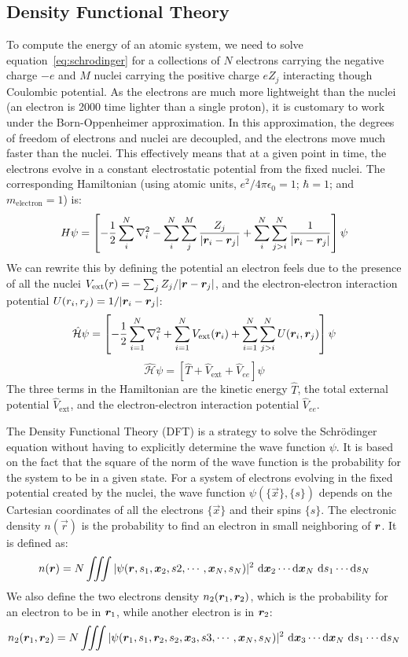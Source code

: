 \documentclass[thesis]{subfiles}
\begin{document}
\subsection{Density Functional Theory}

To compute the energy of an atomic system, we need to solve
equation~\eqref{eq:schrodinger} for a collections of $N$ electrons carrying the
negative charge $-e$ and $M$ nuclei carrying the positive charge $e Z_j$
interacting though Coulombic potential. As the electrons are much more
lightweight than the nuclei (an electron is 2000 time lighter than a single
proton), it is customary to work under the Born-Oppenheimer approximation. In
this approximation, the degrees of freedom of electrons and nuclei are
decoupled, and the electrons move much faster than the nuclei. This effectively
means that at a given point in time, the electrons evolve in a constant
electrostatic potential from the fixed nuclei. The corresponding Hamiltonian
(using atomic units, \ie $e^2 / 4\pi\epsilon_0 = 1$; $\hbar = 1$; and
$m_\text{electron} = 1$) is:
\[H\psi = \left[-\frac 1 2 \sum_i^N \nabla^2_i - \sum_i^N \sum_j^M \frac{Z_j}{|\bm{r}_i - \bm{r}_j|} + \sum_i^N \sum_{j>i}^N \frac{1}{|\bm{r}_i - \bm{r}_j|} \right] \psi\]
We can rewrite this by defining the potential an electron feels due to the
presence of all the nuclei $V_\text{ext}(r) = -\sum_{j} Z_j / |\bm{r} - \bm{r}_j|$, and
the electron-electron interaction potential $U(r_i, r_j) = 1 / |\bm{r}_i -
\bm{r}_j|$:
\[\hat{\mathcal{H}}\psi = \left[-\frac 12\sum_{i=1}^N \nabla^2_i + \sum_{i=1}^N V_\text{ext}(\bm{r}_i) + \sum_{i=1}^N \sum_{j>i}^N U(\bm{r}_i, \bm{r}_j)\right] \psi\]
\[\hat{\mathcal{H}}\psi = \left[\hat T + \hat V_\text{ext} + \hat V_{ee}\right] \psi \label{eq:electronic-hamiltonian}\]
The three terms in the Hamiltonian are the kinetic energy $\hat T$, the total
external potential $\hat V_\text{ext}$, and the electron-electron interaction
potential $\hat V_{ee}$.

The Density Functional Theory (DFT) is a strategy to solve the Schrödinger
equation without having to explicitly determine the wave function $\psi$. It is
based on the fact that the square of the norm of the wave function is the
probability for the system to be in a given state. For a system of electrons
evolving in the fixed potential created by the nuclei, the wave function
$\psi(\{\vec x\}, \{s\})$ depends on the Cartesian coordinates of all the
electrons $\{\vec x\}$ and their spins $\{s\}$. The electronic density $n(\vec
r)$ is the probability to find an electron in small neighboring of $\bm{r}$. It
is defined as:
\[n(\bm{r}) = N \iiint |\psi(\bm{r}, s_1, \bm x_2, s2, \cdots, \bm x_N, s_N)|^2 \ \text{d} \bm x_2 \cdots\text{d} \bm x_N \ \text{d} s_1 \cdots\text{d} s_N \label{eq:electron-density}\]
We also define the two electrons density $n_2(\bm{r}_1, \bm{r}_2)$, which is the
probability for an electron to be in $\bm{r}_1$, while another electron is in
$\bm{r}_2$:
\[n_2(\bm{r}_1, \bm{r}_2) = N \iiint |\psi(\bm{r}_1, s_1, \bm{r}_2, s_2, \bm x_3, s3, \cdots, \bm x_N, s_N)|^2 \ \text{d} \bm x_3 \cdots\text{d} \bm x_N \ \text{d} s_1 \cdots\text{d} s_N\]
\end{document}
